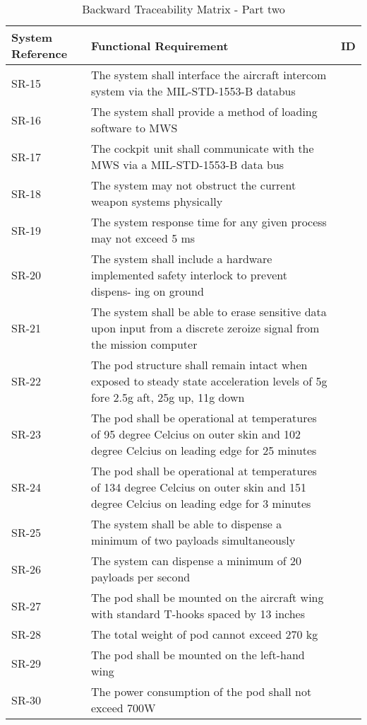 \documentclass[Main]{subfiles}
\begin{document}
\begin{table}[htbp]
	\centering
	\begin{tabular}{p{2cm} p{11cm} l} \hline
	System Reference & Functional Requirement & ID\\\hline
	SR-15 & The system shall interface the aircraft intercom system via the MIL-STD-1553-B
	databus &  \\
	SR-16 & The system shall provide a method of loading software to MWS &  \\
	SR-17 & The cockpit unit shall communicate with the MWS via a MIL-STD-1553-B data bus &  \\
	SR-18 & The system may not obstruct the current weapon systems physically &  \\
	SR-19 & The system response time for any given process may not exceed 5 ms &  \\
	SR-20 & The system shall include a hardware implemented safety interlock to prevent dispens-
	ing on ground &  \\
	SR-21 & The system shall be able to erase sensitive data upon input from a discrete zeroize
	signal from the mission computer &  \\
	SR-22 &  The pod structure shall remain intact when exposed to steady state acceleration levels
	of 5g fore 2.5g aft, 25g up, 11g down &  \\
	SR-23 &  The pod shall be operational at temperatures of 95 degree Celcius on outer skin and
	102 degree Celcius on leading edge for 25 minutes &  \\
	SR-24 &  The pod shall be operational at temperatures of 134 degree Celcius on outer skin and
	151 degree Celcius on leading edge for 3 minutes &  \\
	SR-25 & The system shall be able to dispense a minimum of two payloads simultaneously  &  \\
	SR-26 & The system can dispense a minimum of 20 payloads per second &  \\
	SR-27 & The pod shall be mounted on the aircraft wing with standard T-hooks spaced by 13
	inches &  \\
	SR-28 & The total weight of pod cannot exceed 270 kg  &  \\
	SR-29 & The pod shall be mounted on the left-hand wing &  \\
	SR-30 & The power consumption of the pod shall not exceed 700W &  \\\hline
	\end{tabular}

\caption{Backward Traceability Matrix - Part two}
\label{Tab:BackwardPartTwo}
\end{table}
\end{document}
